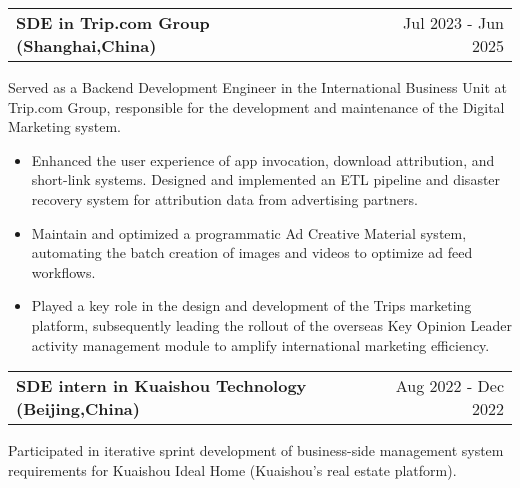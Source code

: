 \documentclass[a4paper,12pt,UTF8]{article}
\makeatletter
\newenvironment{jobshort}[2]
    {
    \begin{tabularx}{\linewidth}{@{}l X r@{}}
    \textbf{#1} & \hfill &  #2 \\[3.75pt]
    \end{tabularx}
    }
    {
    }
\makeatother
\begin{document}
\begin{jobshort}{SDE in Trip.com Group (Shanghai,China)}{Jul 2023 - Jun 2025}
Served as a Backend Development Engineer in the International Business Unit at Trip.com Group, responsible for the development and maintenance of the Digital Marketing system.
\begin{itemize} [nosep]
    \item ​​Enhanced the user experience of app invocation, download attribution, and short-link systems.​​
    ​​Designed and implemented an ETL pipeline and disaster recovery system for attribution data from advertising partners.​​
    \item Maintain and optimized a programmatic ​​Ad Creative Material system, automating the batch creation of images and videos to optimize ad feed workflows.
    \item Played a key role in the design and development of the Trips marketing platform, subsequently leading the rollout of the overseas Key Opinion Leader
    activity management module to amplify international marketing efficiency.  
\end{itemize}
\end{jobshort}


\begin{jobshort}{SDE intern in Kuaishou Technology (Beijing,China)}{Aug 2022 - Dec 2022}
    Participated in iterative sprint development of business-side management system requirements for Kuaishou Ideal Home (Kuaishou’s real estate platform​​). 
\end{jobshort}
  

\end{document}
